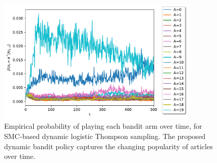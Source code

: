 \begin{figure}[!h]
	\centering
	\vspace*{-2ex}
	\includegraphics[width=0.85\textwidth]{./fods_figs/yahoo/yahoo_logistic_dynamic}
	\vspace*{-2ex}
	\caption{Empirical probability of playing each bandit arm over time, for SMC-based dynamic logistic Thompson sampling.
		The proposed dynamic bandit policy captures the changing popularity of articles over time.}
	\label{fig:yahoo_logistic_dynamic}
\end{figure}


